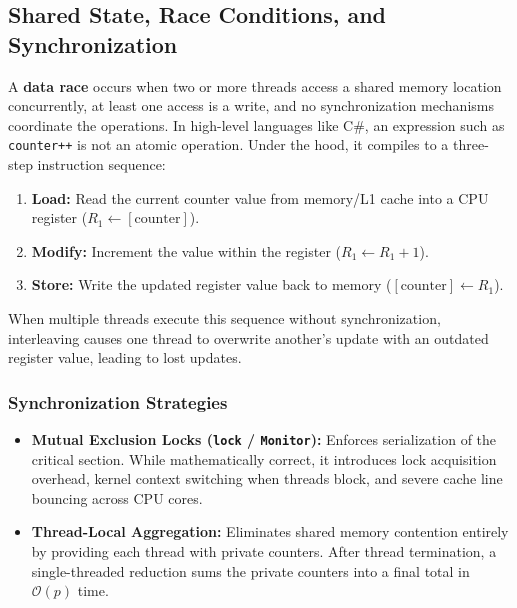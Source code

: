 \documentclass[12pt,a4paper]{article}
\begin{document}
\subsection{Shared State, Race Conditions, and Synchronization}
A \textbf{data race} occurs when two or more threads access a shared memory location concurrently, at least one access is a write, and no synchronization mechanisms coordinate the operations. 
In high-level languages like C\#, an expression such as \texttt{counter++} is not an atomic operation. Under the hood, it compiles to a three-step instruction sequence:
\begin{enumerate}
    \item \textbf{Load:} Read the current counter value from memory/L1 cache into a CPU register ($R_1 \leftarrow [\text{counter}]$).
    \item \textbf{Modify:} Increment the value within the register ($R_1 \leftarrow R_1 + 1$).
    \item \textbf{Store:} Write the updated register value back to memory ($[\text{counter}] \leftarrow R_1$).
\end{enumerate}
When multiple threads execute this sequence without synchronization, interleaving causes one thread to overwrite another's update with an outdated register value, leading to lost updates.

\subsubsection{Synchronization Strategies}
\begin{itemize}
    \item \textbf{Mutual Exclusion Locks (\texttt{lock} / \texttt{Monitor}):} Enforces serialization of the critical section. While mathematically correct, it introduces lock acquisition overhead, kernel context switching when threads block, and severe cache line bouncing across CPU cores.
    \item \textbf{Thread-Local Aggregation:} Eliminates shared memory contention entirely by providing each thread with private counters. After thread termination, a single-threaded reduction sums the private counters into a final total in $\mathcal{O}(p)$ time.
\end{itemize}
\end{document}
